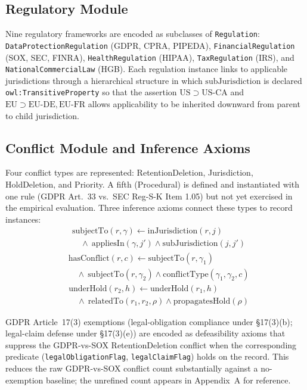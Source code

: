 \documentclass{ieeeaccess}
\begin{document}
\subsection{Regulatory Module}

Nine regulatory frameworks are encoded as subclasses of \texttt{Regulation}: \texttt{DataProtectionRegulation} (GDPR, CPRA, PIPEDA), \texttt{FinancialRegulation} (SOX, SEC, FINRA), \texttt{HealthRegulation} (HIPAA), \texttt{TaxRegulation} (IRS), and \texttt{NationalCommercialLaw} (HGB). Each regulation instance links to applicable jurisdictions through a hierarchical structure in which $\mathrm{subJurisdiction}$ is declared \texttt{owl:TransitiveProperty} so that the assertion $\mathrm{US} \supset \mathrm{US\text{-}CA}$ and $\mathrm{EU} \supset \mathrm{EU\text{-}DE}, \mathrm{EU\text{-}FR}$ allows applicability to be inherited downward from parent to child jurisdiction.

\subsection{Conflict Module and Inference Axioms}

Four conflict types are represented: RetentionDeletion, Jurisdiction, HoldDeletion, and Priority. A fifth (Procedural) is defined and instantiated with one rule (GDPR Art.~33 vs.\ SEC Reg-S-K Item 1.05) but not yet exercised in the empirical evaluation. Three inference axioms connect these types to record instances:
\begin{align}
&\mathrm{subjectTo}(r, \gamma) \leftarrow \mathrm{inJurisdiction}(r, j) \nonumber \\
&\quad \wedge\ \mathrm{appliesIn}(\gamma, j') \wedge \mathrm{subJurisdiction}(j, j') \tag{Ax.~1}
\end{align}
\begin{align}
&\mathrm{hasConflict}(r, c) \leftarrow \mathrm{subjectTo}(r, \gamma_1) \nonumber \\
&\quad \wedge\ \mathrm{subjectTo}(r, \gamma_2) \wedge \mathrm{conflictType}(\gamma_1, \gamma_2, c) \tag{Ax.~2}
\end{align}
\begin{align}
&\mathrm{underHold}(r_2, h) \leftarrow \mathrm{underHold}(r_1, h) \nonumber \\
&\quad \wedge\ \mathrm{relatedTo}(r_1, r_2, \rho) \wedge \mathrm{propagatesHold}(\rho) \tag{Ax.~3}
\end{align}

GDPR Article~17(3) exemptions (legal-obligation compliance under §17(3)(b); legal-claim defense under §17(3)(e)) are encoded as defeasibility axioms that suppress the GDPR-vs-SOX RetentionDeletion conflict when the corresponding predicate (\texttt{legalObligationFlag}, \texttt{legalClaimFlag}) holds on the record. This reduces the raw GDPR-vs-SOX conflict count substantially against a no-exemption baseline; the unrefined count appears in Appendix~A for reference.
\end{document}
